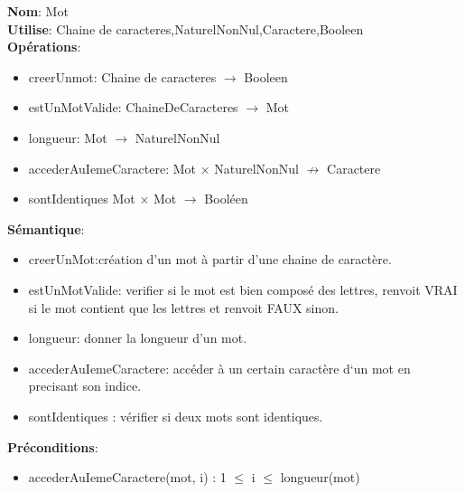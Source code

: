 \documentclass{article}
\begin{document}
    \noindent
    \textbf{Nom}: Mot \\
    \textbf{Utilise}: Chaine de caracteres,NaturelNonNul,Caractere,Booleen \\
    \textbf{Opérations}: \begin{itemize}[label=$\ $, leftmargin=2cm, itemsep=0cm]
        \item creerUnmot: Chaine de caracteres $\rightarrow $ Booleen
        \item estUnMotValide: ChaineDeCaracteres $ \rightarrow$ Mot
        \item longueur: Mot $ \rightarrow$  NaturelNonNul
        \item accederAuIemeCaractere: Mot $ \times $ NaturelNonNul $ \nrightarrow$  Caractere
        \item sontIdentiques Mot $ \times $ Mot $ \rightarrow$  Booléen
    \end{itemize}
    
    \textbf{Sémantique}: \begin{itemize}[label=$\- $, leftmargin=2cm, itemsep=0cm]
      \item creerUnMot:création d’un mot à partir d’une chaine de caractère.
        \item estUnMotValide: verifier si le mot est bien composé des lettres, renvoit VRAI si le mot contient que les lettres et renvoit FAUX sinon.
        \item longueur: donner la longueur d’un mot.
        \item accederAuIemeCaractere: accéder à un certain caractère d`un mot en precisant son indice.
         \item sontIdentiques : vérifier si deux mots sont identiques.
    \end{itemize}

    \textbf{Préconditions}: \begin{itemize}[label=$\- $, leftmargin=2cm, itemsep=0cm]
        \item accederAuIemeCaractere(mot, i) : 1 $\leq$ i $\leq$ longueur(mot)
    \end{itemize}
\end{document}
